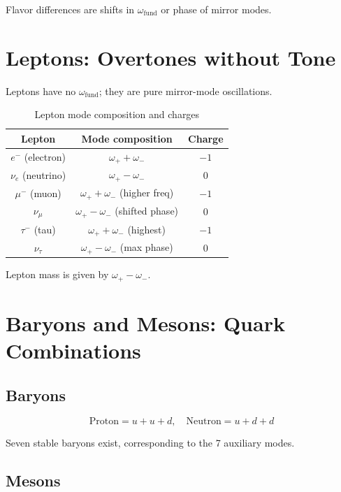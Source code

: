 \documentclass[12pt,a4paper]{article}
\begin{document}
Flavor differences are shifts in \(\omega_{\text{fund}}\) or phase of mirror modes.

\section{Leptons: Overtones without Tone}

Leptons have no \(\omega_{\text{fund}}\); they are pure mirror-mode oscillations.

\begin{table}[h]
\centering
\caption{Lepton mode composition and charges}
\begin{tabular}{c|c|c}
\toprule
\textbf{Lepton} & \textbf{Mode composition} & \textbf{Charge} \\
\midrule
\( e^- \) (electron) & \( \omega_{+} + \omega_{-} \) & \( -1 \) \\
\( \nu_e \) (neutrino) & \( \omega_{+} - \omega_{-} \) & \( 0 \) \\
\( \mu^- \) (muon) & \( \omega_{+} + \omega_{-} \) (higher freq) & \( -1 \) \\
\( \nu_\mu \) & \( \omega_{+} - \omega_{-} \) (shifted phase) & \( 0 \) \\
\( \tau^- \) (tau) & \( \omega_{+} + \omega_{-} \) (highest) & \( -1 \) \\
\( \nu_\tau \) & \( \omega_{+} - \omega_{-} \) (max phase) & \( 0 \) \\
\bottomrule
\end{tabular}
\end{table}

Lepton mass is given by \(\omega_{+} - \omega_{-}\).

\section{Baryons and Mesons: Quark Combinations}

\subsection{Baryons}

\[
\text{Proton} = u + u + d, \quad \text{Neutron} = u + d + d
\]

Seven stable baryons exist, corresponding to the 7 auxiliary modes.

\subsection{Mesons}
\end{document}
